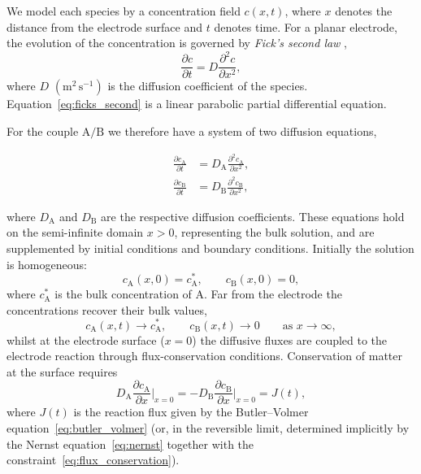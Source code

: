 We model each species by a concentration field $c(x,t)$, where $x$
denotes the distance from the electrode surface and $t$ denotes time.
For a planar electrode, the evolution of the concentration is governed by
\emph{Fick's second law} \cite{crank1979mathematics},
\begin{equation}\label{eq:ficks_second}
  \frac{\partial c}{\partial t} = D\frac{\partial^{2} c}{\partial x^{2}},
\end{equation}
where $D$ $(\mathrm{m}^2\,\mathrm{s}^{-1})$ is the diffusion coefficient
of the species. Equation~\eqref{eq:ficks_second} is a linear
parabolic partial differential equation.

For the couple $\mathrm{A}/\mathrm{B}$ we therefore have a system of two
diffusion equations,

\begin{align}
  \frac{\partial c_{\mathrm{A}}}{\partial t}
  &= D_{\mathrm{A}}\frac{\partial^{2} c_{\mathrm{A}}}{\partial x^{2}},
  \label{eq:diffusion_A}\\
  \frac{\partial c_{\mathrm{B}}}{\partial t}
  &= D_{\mathrm{B}}\frac{\partial^{2} c_{\mathrm{B}}}{\partial x^{2}},
  \label{eq:diffusion_B}
\end{align}

where $D_{\mathrm{A}}$ and $D_{\mathrm{B}}$ are the respective diffusion
coefficients. These equations hold on the semi-infinite domain $x > 0$,
representing the bulk solution, and are supplemented by initial conditions
and boundary conditions. Initially the solution is homogeneous:
\begin{equation}
  c_{\mathrm{A}}(x,0) = c_{\mathrm{A}}^{\ast}, \qquad
  c_{\mathrm{B}}(x,0) = 0,
\end{equation}
where $c_{\mathrm{A}}^{\ast}$ is the bulk concentration of $\mathrm{A}$.
Far from the electrode the concentrations recover their bulk values,
\begin{equation}
  c_{\mathrm{A}}(x,t) \to c_{\mathrm{A}}^{\ast}, \qquad
  c_{\mathrm{B}}(x,t) \to 0 \qquad \text{as } x \to \infty,
\end{equation}
whilst at the electrode surface ($x = 0$) the diffusive fluxes are
coupled to the electrode reaction through flux-conservation conditions.
Conservation of matter at the surface requires
\begin{equation}\label{eq:flux_conservation}
  D_{\mathrm{A}}\frac{\partial c_{\mathrm{A}}}{\partial x}\bigg|_{x=0}
  = -D_{\mathrm{B}}\frac{\partial c_{\mathrm{B}}}{\partial x}\bigg|_{x=0}
  = J(t),
\end{equation}
where $J(t)$ is the reaction flux given by the Butler--Volmer
equation~\eqref{eq:butler_volmer} (or, in the reversible limit, determined
  implicitly by the Nernst equation~\eqref{eq:nernst} together with the
constraint~\eqref{eq:flux_conservation}).


